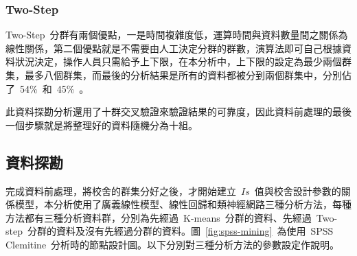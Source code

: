\subsubsection{Two-Step}

Two-Step~分群有兩個優點，一是時間複雜度低，運算時間與資料數量間之關係為線性關係，第二個優點就是不需要由人工決定分群的群數，演算法即可自己根據資料狀況決定，操作人員只需給予上下限，在本分析中，上下限的設定為最少兩個群集，最多八個群集，而最後的分析結果是所有的資料都被分到兩個群集中，分別佔了~54\%~和~45\%~。


此資料探勘分析還用了十群交叉驗證來驗證結果的可靠度，因此資料前處理的最後一個步驟就是將整理好的資料隨機分為十組。


\subsection{資料探勘}

完成資料前處理，將校舍的群集分好之後，才開始建立~$Is$~值與校舍設計參數的關係模型，本分析使用了廣義線性模型、線性回歸和類神經網路三種分析方法，每種方法都有三種分析資料群，分別為先經過~K-means~分群的資料、先經過~Two-step~分群的資料及沒有先經過分群的資料。圖~\ref{fig:spss-mining}~為使用~SPSS Clemitine~分析時的節點設計圖。以下分別對三種分析方法的參數設定作說明。

